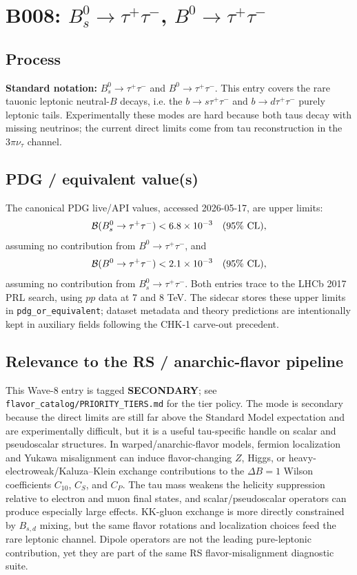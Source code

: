 
\section{B008: \(B_s^0\to\tau^+\tau^-\), \(B^0\to\tau^+\tau^-\)}

\subsection*{Process}
\textbf{Standard notation:} \(B_s^0 \to \tau^+\tau^-\) and
\(B^0 \to \tau^+\tau^-\).  This entry covers the rare tauonic leptonic
neutral-\(B\) decays, i.e. the \(b\to s\tau^+\tau^-\) and
\(b\to d\tau^+\tau^-\) purely leptonic tails.  Experimentally these modes are
hard because both taus decay with missing neutrinos; the current direct limits
come from tau reconstruction in the \(3\pi\nu_\tau\) channel.

\subsection*{PDG / equivalent value(s)}
The canonical PDG live/API values, accessed 2026-05-17, are upper limits:
\[
  {\cal B}(B_s^0\to\tau^+\tau^-) < 6.8\times10^{-3}\quad(95\%\ {\rm CL}),
\]
assuming no contribution from \(B^0\to\tau^+\tau^-\), and
\[
  {\cal B}(B^0\to\tau^+\tau^-) < 2.1\times10^{-3}\quad(95\%\ {\rm CL}),
\]
assuming no contribution from \(B_s^0\to\tau^+\tau^-\).  Both entries trace to
the LHCb 2017 PRL search, using \(pp\) data at 7 and 8 TeV.  The sidecar stores
these upper limits in \texttt{pdg\_or\_equivalent}; dataset metadata and
theory predictions are intentionally kept in auxiliary fields following the
CHK-1 carve-out precedent.

\subsection*{Relevance to the RS / anarchic-flavor pipeline}
This Wave-8 entry is tagged \textbf{SECONDARY}; see
\texttt{flavor\_catalog/PRIORITY\_TIERS.md} for the tier policy.  The mode is
secondary because the direct limits are still far above the Standard Model
expectation and are experimentally difficult, but it is a useful tau-specific
handle on scalar and pseudoscalar structures.  In warped/anarchic-flavor
models, fermion localization and Yukawa misalignment can induce flavor-changing
\(Z\), Higgs, or heavy-electroweak/Kaluza--Klein exchange contributions to the
\(\Delta B=1\) Wilson coefficients \(C_{10}\), \(C_S\), and \(C_P\).  The tau
mass weakens the helicity suppression relative to electron and muon final
states, and scalar/pseudoscalar operators can produce especially large effects.
KK-gluon exchange is more directly constrained by \(B_{s,d}\) mixing, but the
same flavor rotations and localization choices feed the rare leptonic channel.
Dipole operators are not the leading pure-leptonic contribution, yet they are
part of the same RS flavor-misalignment diagnostic suite.

